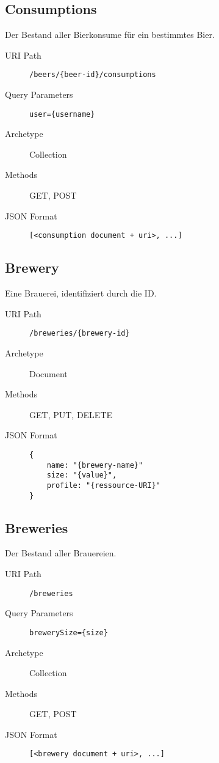 \documentclass[10pt,a4paper]{scrartcl}
\begin{document}
\subsection{Consumptions}

Der Bestand aller Bierkonsume für ein bestimmtes Bier.

\begin{description}
	\item[URI Path] \texttt{/beers/\{beer-id\}/consumptions}
 	\item[Query Parameters] \texttt{user=\{username\}}
	\item[Archetype] Collection
	\item[Methods] GET, POST
	\item[JSON Format] \hfill
\begin{lstlisting}
[<consumption document + uri>, ...]
\end{lstlisting}
\end{description}


\subsection{Brewery}

Eine Brauerei, identifiziert durch die ID.

\begin{description}
	\item[URI Path] \texttt{/breweries/\{brewery-id\}}
	\item[Archetype] Document
	\item[Methods] GET, PUT, DELETE
	\item[JSON Format] \hfill
\begin{lstlisting}
{	
	name: "{brewery-name}"
	size: "{value}",
	profile: "{ressource-URI}"
}
\end{lstlisting}
\end{description}


\subsection{Breweries}

Der Bestand aller Brauereien.

\begin{description}
	\item[URI Path] \texttt{/breweries}
	\item[Query Parameters] \texttt{brewerySize=\{size\}}
	\item[Archetype] Collection
	\item[Methods] GET, POST
	\item[JSON Format] \hfill
\begin{lstlisting}
[<brewery document + uri>, ...]
\end{lstlisting}
\end{description}
\end{document}
